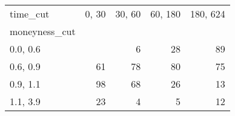 \begin{tabular}{lrrrr}
\toprule
time\_cut &  0, 30 &  30, 60 &  60, 180 &  180, 624 \\
moneyness\_cut &          &           &            &             \\
\midrule
0.0, 0.6    &          &         6 &         28 &          89 \\
0.6, 0.9    &       61 &        78 &         80 &          75 \\
0.9, 1.1    &       98 &        68 &         26 &          13 \\
1.1, 3.9    &       23 &         4 &          5 &          12 \\
\bottomrule
\end{tabular}
